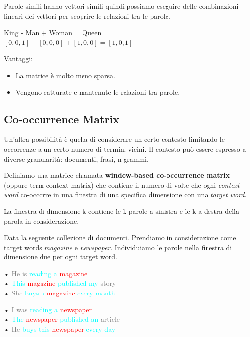 Parole simili hanno vettori simili quindi possiamo eseguire delle combinazioni lineari dei vettori per scoprire le relazioni tra le parole.
%
\begin{center}
  King  - Man     + Woman  = Queen \\
  $[0,0,1]  - [0,0,0]  + [1,0,0] = [1,0,1]$
\end{center}

Vantaggi:
\begin{itemize}
  \item La matrice è molto meno sparsa.
  \item Vengono catturate e mantenute le relazioni tra parole.
\end{itemize}

\subsection*{Co-occurrence Matrix}
Un'altra possibilità è quella di considerare un certo contesto limitando le occorrenze a un certo numero di termini vicini.
Il contesto può essere espresso a diverse granularità: documenti, frasi, n-grammi.

Definiamo una matrice chiamata \textbf{window-based co-occurrence matrix} (oppure term-context matrix) che contiene il numero di volte che ogni \textit{context word} co-occorre in una finestra di una specifica dimensione con una \textit{target word}.

La finestra di dimensione k contiene le k parole a sinistra e le k a destra della parola in considerazione.

\bigskip
\bigskip
Data la seguente collezione di documenti. Prendiamo in considerazione come target words \textit{magazine} e \textit{newspaper}.
Individuiamo le parole nella finestra di dimensione due per ogni target word.
\begin{framed}
  \centering
  \begin{minipage}{0.5\linewidth}
    \small
    • \textcolor{gray}{He is} \textcolor{cyan}{reading a} \textcolor{red}{magazine}\\
    • \textcolor{cyan}{This} \textcolor{red}{magazine} \textcolor{cyan}{published my} \textcolor{gray}{story}\\
    • \textcolor{gray}{She} \textcolor{cyan}{buys a} \textcolor{red}{magazine} \textcolor{cyan}{every month}
  \end{minipage}
  \begin{minipage}{0.45\linewidth}
    \small
    • \textcolor{gray}{I was} \textcolor{cyan}{reading a} \textcolor{red}{newspaper}\\
    • \textcolor{cyan}{The} \textcolor{red}{newspaper} \textcolor{cyan}{published an} \textcolor{gray}{article}\\
    • \textcolor{gray}{He} \textcolor{cyan}{buys this} \textcolor{red}{newspaper} \textcolor{cyan}{every day}
  \end{minipage}
\end{framed}

